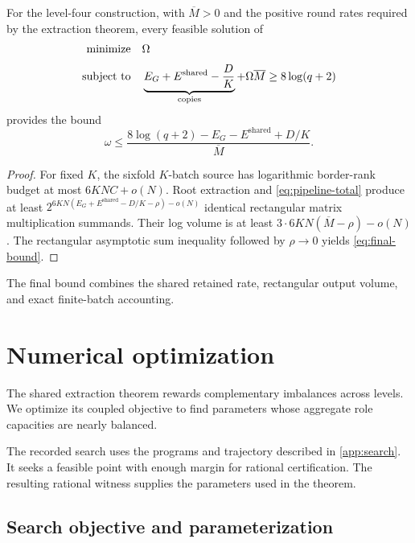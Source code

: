 \documentclass[11pt,a4paper]{article}
\newcommand{\Eshared}{E^{\mathrm{shared}}}
\newcommand{\Mbar}{\overline M}
\begin{document}
\begin{resultbox}
\begin{theorem}\label{thm:assembly}
For the level-four construction, with $\Mbar>0$ and the positive round rates required by the extraction theorem, every feasible solution of
\begin{equation}\label{eq:new-opt}
\begin{aligned}
\operatorname{minimize}\quad &\Omega\\[3pt]
\text{\normalfont subject to}\quad &
\underbrace{E_G+\Eshared-\frac DK}_{\text{\upshape copies}}
+\Omega\Mbar\ge8\log(q+2)
\end{aligned}
\end{equation}
provides the bound
\begin{equation}\label{eq:final-bound}
\omega\le\frac{8\log(q+2)-E_G-\Eshared+D/K}{\Mbar}.
\end{equation}
\end{theorem}
\end{resultbox}

\begin{proof}
For fixed $K$, the sixfold $K$-batch source has logarithmic border-rank budget at most $6KNC+o(N)$. Root extraction and \cref{eq:pipeline-total} produce at least
$2^{6KN(E_G+\Eshared-D/K-\rho)-o(N)}$ identical rectangular matrix multiplication summands. Their log volume is at least $3\cdot6KN(\Mbar-\rho)-o(N)$. The rectangular asymptotic sum inequality followed by $\rho\to0$ yields \cref{eq:final-bound}.
\end{proof}

The final bound combines the shared retained rate, rectangular output volume, and exact finite-batch accounting.

\section{Numerical optimization}\label{sec:optimization}

The shared extraction theorem rewards complementary imbalances across levels. We optimize its coupled objective to find parameters whose aggregate role capacities are nearly balanced.

The recorded search uses the programs and trajectory described in \cref{app:search}. It seeks a feasible point with enough margin for rational certification. The resulting rational witness supplies the parameters used in the theorem.

\subsection{Search objective and parameterization}
\end{document}
